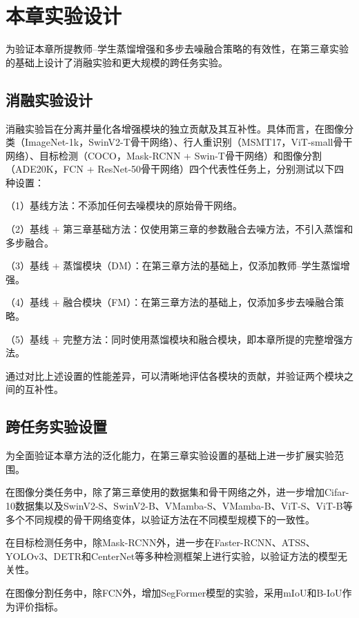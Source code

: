 \section{本章实验设计}
\label{sec:chap4_exp_setup}

为验证本章所提教师--学生蒸馏增强和多步去噪融合策略的有效性，在第三章实验的基础上设计了消融实验和更大规模的跨任务实验。

\subsection{消融实验设计}

消融实验旨在分离并量化各增强模块的独立贡献及其互补性。具体而言，在图像分类（ImageNet-1k，SwinV2-T骨干网络）、行人重识别（MSMT17，ViT-small骨干网络）、目标检测（COCO，Mask-RCNN + Swin-T骨干网络）和图像分割（ADE20K，FCN + ResNet-50骨干网络）四个代表性任务上，分别测试以下四种设置：

（1）基线方法：不添加任何去噪模块的原始骨干网络。

（2）基线 + 第三章基础方法：仅使用第三章的参数融合去噪方法，不引入蒸馏和多步融合。

（3）基线 + 蒸馏模块（DM）：在第三章方法的基础上，仅添加教师--学生蒸馏增强。

（4）基线 + 融合模块（FM）：在第三章方法的基础上，仅添加多步去噪融合策略。

（5）基线 + 完整方法：同时使用蒸馏模块和融合模块，即本章所提的完整增强方法。

通过对比上述设置的性能差异，可以清晰地评估各模块的贡献，并验证两个模块之间的互补性。

\subsection{跨任务实验设置}

为全面验证本章方法的泛化能力，在第三章实验设置的基础上进一步扩展实验范围。

在图像分类任务中，除了第三章使用的数据集和骨干网络之外，进一步增加Cifar-10\cite{krizhevsky2009learning}数据集以及SwinV2-S、SwinV2-B、VMamba-S、VMamba-B、ViT-S、ViT-B等多个不同规模的骨干网络变体，以验证方法在不同模型规模下的一致性。

在目标检测任务中，除Mask-RCNN外，进一步在Faster-RCNN\cite{ren2015faster}、ATSS\cite{zhang2020bridging}、YOLOv3\cite{redmon2018yolov3}、DETR\cite{carion2020end}和CenterNet\cite{zhou2019objects}等多种检测框架上进行实验，以验证方法的模型无关性。

在图像分割任务中，除FCN\cite{long2015fully}外，增加SegFormer\cite{xie2021segformer}模型的实验，采用mIoU和B-IoU作为评价指标。

